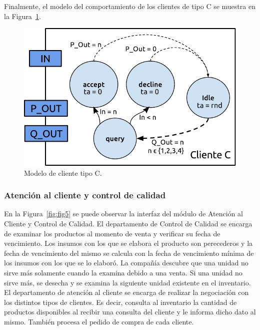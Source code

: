 \documentclass[10pt]{article}
\begin{document}
Finalmente, el modelo del comportamiento de los clientes de tipo C se muestra en la Figura~\ref{fig:fig4}.

\begin{figure}[h]
\centering
\includegraphics[scale=1]{img/figura4}
\caption{Modelo de cliente tipo C.}
\label{fig:fig4}
\end{figure}
\FloatBarrier

\subsubsection{Atención al cliente y control de calidad}
En la Figura~\ref{fig:fig5} se puede observar la interfaz del módulo de Atención al Cliente y Control de Calidad.
El departamento de Control de Calidad se encarga de examinar los productos al momento de venta y verificar su fecha de vencimiento. Los insumos con los que se elabora el producto son perecederos y la fecha de vencimiento del mismo se calcula con la fecha de vencimiento mínima de los insumos con los que se lo elaboró. La compañía descubre que una unidad no sirve más solamente cuando la examina debido a una venta. Si una unidad no sirve más, se desecha y se examina la siguiente unidad existente en el inventario.
El departamento de atención al cliente se encarga de realizar la negociación con los distintos tipos de clientes. Es decir, consulta al inventario la cantidad de productos disponibles al recibir una consulta del cliente y le informa dicho dato al mismo. También procesa el pedido de compra de cada cliente.
             
\end{document}
